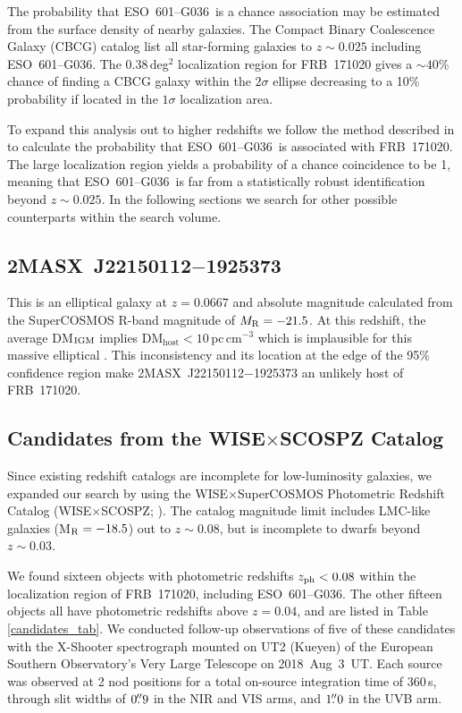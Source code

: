 \documentclass[twocolumn]{aastex63}
\newcommand{\galname}{ESO~601--G036}
\begin{document}
The probability that \galname\ is a chance association may be 
estimated from the surface density of nearby galaxies.
The Compact Binary Coalescence Galaxy (CBCG) catalog \citep{cbcg} 
list all star-forming galaxies to $z \sim 0.025$ 
including \galname. The 0.38\,deg$^2$ localization region for 
FRB~171020 gives a $\sim 40$\% chance of finding a CBCG galaxy within the $2\sigma$ ellipse decreasing to a 10\% probability if located in the $1\sigma$ localization area.

To expand this analysis out to higher redshifts we follow the method described in \citet{Eftekhari2017} to calculate the probability that \galname\ is associated with FRB~171020. The large localization region yields a probability of a chance coincidence to be 1, meaning that \galname\ is far from a statistically robust identification beyond $z \sim 0.025$. In the following sections we search for other possible counterparts within the search volume. 

\subsection{\bf 2MASX~J22150112$-$1925373} 
This is an elliptical galaxy at $z=0.0667$ \citep{6df} and absolute magnitude calculated from the SuperCOSMOS R-band magnitude of $M_{\rm R}=-21.5$. 
At this redshift, the average DM$_{\rm IGM}$ implies 
DM$_{\mathrm{host}}<10$\,pc\,cm$^{-3}$ which 
is implausible for this massive elliptical \citep{Xu2015, walker2018}.
This inconsistency and its location at the edge
of the 95\% confidence region make 2MASX~J22150112$-$1925373 an
unlikely host of FRB~171020.

\subsection{Candidates from the WISE$\times$SCOSPZ Catalog}

Since existing redshift catalogs are incomplete for low-luminosity galaxies, we expanded our search 
by using the WISE$\times$SuperCOSMOS Photometric Redshift Catalog (WISE$\times$SCOSPZ; \citealt{WISExSCOSPZ}). 
The catalog magnitude limit includes LMC-like galaxies 
(M$_{\rm R}=-18.5$) out to $z\sim0.08$, but is incomplete to 
dwarfs beyond $z\sim0.03$. 

We found sixteen objects with photometric redshifts $z_{\rm ph}<0.08$ within the localization region of FRB~171020, including \galname. The other fifteen objects all have photometric redshifts above $z=0.04$, and are listed in Table \ref{candidates_tab}.
We conducted follow-up observations of five of these candidates with 
the X-Shooter spectrograph \citep{Vernet2011} mounted on UT2 (Kueyen) of the
European Southern Observatory's Very Large Telescope  
on 2018~Aug~3~UT. 
Each source was observed at 2 nod positions for a total on-source integration time of
360\,s, through slit widths of $0\mbox{$.\!\!^{\prime\prime}$}9$ in the NIR
and VIS arms, and $1\mbox{$.\!\!^{\prime\prime}$}0$ in the UVB arm. 
\end{document}
